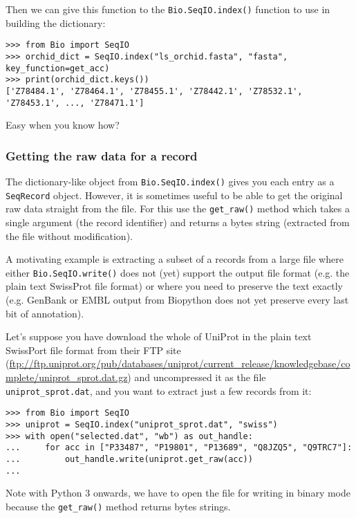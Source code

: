 \noindent Then we can give this function to the \verb|Bio.SeqIO.index()|
function to use in building the dictionary:

\begin{verbatim}
>>> from Bio import SeqIO
>>> orchid_dict = SeqIO.index("ls_orchid.fasta", "fasta", key_function=get_acc)
>>> print(orchid_dict.keys())
['Z78484.1', 'Z78464.1', 'Z78455.1', 'Z78442.1', 'Z78532.1', 'Z78453.1', ..., 'Z78471.1']
\end{verbatim}

\noindent Easy when you know how?

\subsubsection{Getting the raw data for a record}
\label{sec:seqio-index-getraw}

The dictionary-like object from \verb|Bio.SeqIO.index()| gives you each
entry as a \verb|SeqRecord| object. However, it is sometimes useful to
be able to get the original raw data straight from the file. For this
use the \verb|get_raw()| method which takes a
single argument (the record identifier) and returns a bytes string
(extracted from the file without modification).

A motivating example is extracting a subset of a records from a large
file where either \verb|Bio.SeqIO.write()| does not (yet) support the
output file format (e.g. the plain text SwissProt file format) or
where you need to preserve the text exactly (e.g. GenBank or EMBL
output from Biopython does not yet preserve every last bit of
annotation).

Let's suppose you have download the whole of UniProt in the plain
text SwissPort file format from their FTP site
(\url{ftp://ftp.uniprot.org/pub/databases/uniprot/current_release/knowledgebase/complete/uniprot_sprot.dat.gz})
and uncompressed it as the file \verb|uniprot_sprot.dat|, and you
want to extract just a few records from it:

\begin{verbatim}
>>> from Bio import SeqIO
>>> uniprot = SeqIO.index("uniprot_sprot.dat", "swiss")
>>> with open("selected.dat", "wb") as out_handle:
...     for acc in ["P33487", "P19801", "P13689", "Q8JZQ5", "Q9TRC7"]:
...         out_handle.write(uniprot.get_raw(acc))
...
\end{verbatim}

Note with Python 3 onwards, we have to open the file for writing in
binary mode because the \verb|get_raw()| method returns bytes strings.

